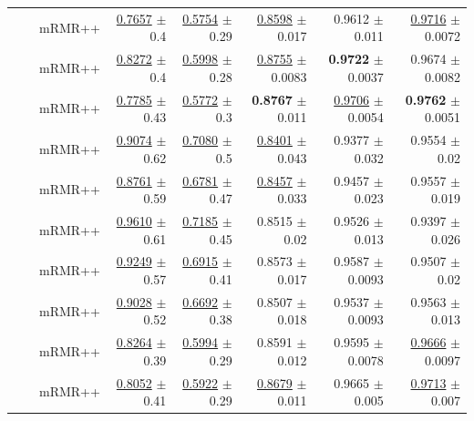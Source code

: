 \begin{longtable}{llp{}rrrrr}
 &  & mRMR++ & \underline{0.7657} {\scriptsize $\pm$ 0.4} & \underline{0.5754} {\scriptsize $\pm$ 0.29} & \underline{0.8598} {\scriptsize $\pm$ 0.017} & 0.9612 {\scriptsize $\pm$ 0.011} & \underline{0.9716} {\scriptsize $\pm$ 0.0072} \\
 &  & mRMR++ & \underline{0.8272} {\scriptsize $\pm$ 0.4} & \underline{0.5998} {\scriptsize $\pm$ 0.28} & \underline{0.8755} {\scriptsize $\pm$ 0.0083} & \textbf{0.9722} {\scriptsize $\pm$ 0.0037} & 0.9674 {\scriptsize $\pm$ 0.0082} \\
 &  & mRMR++ & \underline{0.7785} {\scriptsize $\pm$ 0.43} & \underline{0.5772} {\scriptsize $\pm$ 0.3} & \textbf{0.8767} {\scriptsize $\pm$ 0.011} & \underline{0.9706} {\scriptsize $\pm$ 0.0054} & \textbf{0.9762} {\scriptsize $\pm$ 0.0051} \\
 &  & mRMR++ & \underline{0.9074} {\scriptsize $\pm$ 0.62} & \underline{0.7080} {\scriptsize $\pm$ 0.5} & \underline{0.8401} {\scriptsize $\pm$ 0.043} & 0.9377 {\scriptsize $\pm$ 0.032} & 0.9554 {\scriptsize $\pm$ 0.02} \\
 &  & mRMR++ & \underline{0.8761} {\scriptsize $\pm$ 0.59} & \underline{0.6781} {\scriptsize $\pm$ 0.47} & \underline{0.8457} {\scriptsize $\pm$ 0.033} & 0.9457 {\scriptsize $\pm$ 0.023} & 0.9557 {\scriptsize $\pm$ 0.019} \\
 &  & mRMR++ & \underline{0.9610} {\scriptsize $\pm$ 0.61} & \underline{0.7185} {\scriptsize $\pm$ 0.45} & 0.8515 {\scriptsize $\pm$ 0.02} & 0.9526 {\scriptsize $\pm$ 0.013} & 0.9397 {\scriptsize $\pm$ 0.026} \\
 &  & mRMR++ & \underline{0.9249} {\scriptsize $\pm$ 0.57} & \underline{0.6915} {\scriptsize $\pm$ 0.41} & 0.8573 {\scriptsize $\pm$ 0.017} & 0.9587 {\scriptsize $\pm$ 0.0093} & 0.9507 {\scriptsize $\pm$ 0.02} \\
 &  & mRMR++ & \underline{0.9028} {\scriptsize $\pm$ 0.52} & \underline{0.6692} {\scriptsize $\pm$ 0.38} & 0.8507 {\scriptsize $\pm$ 0.018} & 0.9537 {\scriptsize $\pm$ 0.0093} & 0.9563 {\scriptsize $\pm$ 0.013} \\
 &  & mRMR++ & \underline{0.8264} {\scriptsize $\pm$ 0.39} & \underline{0.5994} {\scriptsize $\pm$ 0.29} & 0.8591 {\scriptsize $\pm$ 0.012} & 0.9595 {\scriptsize $\pm$ 0.0078} & \underline{0.9666} {\scriptsize $\pm$ 0.0097} \\
 &  & mRMR++ & \underline{0.8052} {\scriptsize $\pm$ 0.41} & \underline{0.5922} {\scriptsize $\pm$ 0.29} & \underline{0.8679} {\scriptsize $\pm$ 0.011} & 0.9665 {\scriptsize $\pm$ 0.005} & \underline{0.9713} {\scriptsize $\pm$ 0.007} \\

\end{longtable}

